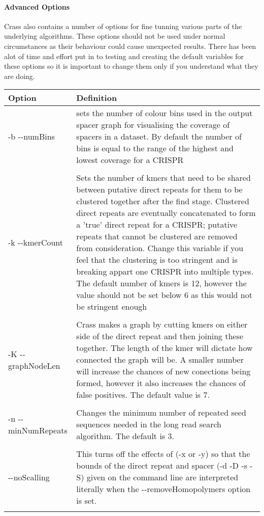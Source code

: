 \documentclass[11pt]{article} %
\begin{document}
\paragraph{Advanced Options}
Crass also contains a number of options for fine tunning various parts of the underlying algorithms.  These options should not be used under normal circumstances as their behaviour could cause unexpected results.  There has been alot of time and effort put in to testing and creating the default variables for these options so it is important to change them only if you understand what they are doing.
    \begin{longtable}{  l   p{10cm} }
    \hline
    Option & Definition \\  \hline\hline 
-b -{}-numBins &  sets the number of colour bins used in the output spacer graph for visualising the coverage of spacers in a dataset.  By default the number of bins is equal to the range of the highest and lowest coverage for a CRISPR \\ \\
-k -{}-kmerCount & Sets the number of kmers that need to be shared between putative direct repeats for them to be clustered together after the find stage.  Clustered direct repeats are eventually concatenated to form a 'true' direct repeat for a CRISPR; putative repeats that cannot be clustered are removed from consideration.  Change this variable if you feel that the clustering is too stringent and is breaking appart one CRISPR into multiple types.  The default number of kmers is 12, however the value should not be set below 6 as this would not be stringent enough\\ \\
-K -{}-graphNodeLen & Crass makes a graph by cutting kmers on either side of the direct repeat and then joining these together.  The length of the kmer will dictate how connected the graph will be.  A smaller number will increase the chances of new conections being formed, however it also increases the chances of false positives.  The default value is 7.\\ \\
-n -{}-minNumRepeats & Changes the minimum number of repeated seed sequences needed in the long read search algorithm. The default is 3.\\ \\
-{}-noScalling & This turns off the effects of (-x or -y) so that the bounds of the direct repeat and spacer (-d -D -s -S) given on the command line are interpreted literally when the -{}-removeHomopolymers option is set. \\ \\

\end{longtable}
\end{document}

